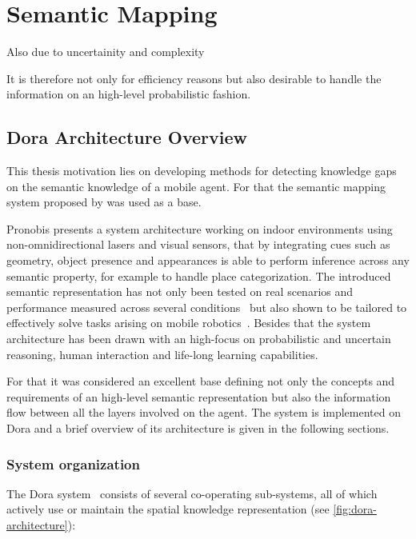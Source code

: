 \chapter{Semantic Mapping}\label{chap:semantic-mapping}

Also due to uncertainity and complexity 
% 

It is therefore not only for efficiency reasons but also desirable to handle
the information on an high-level probabilistic fashion.



\section{Dora Architecture Overview}
This thesis motivation lies on developing methods for detecting knowledge gaps
on the semantic knowledge of a mobile agent. For that the semantic mapping system
proposed by \cite{pronobis2011phd} was used as a base.

Pronobis presents a system architecture working on indoor environments using
non\hyp{}omnidirectional lasers and visual sensors, that by integrating cues such as geometry,
object presence and appearances is able to perform inference across any semantic property,
for example to handle place categorization.
The introduced semantic representation has not only been tested on real scenarios
and performance measured across several conditions~\cite{pronobis2007iros} but also shown
to be tailored to effectively solve tasks arising on mobile robotics~\cite{hanheide2011ijcai}.
Besides that the system architecture has been drawn with an high-focus on probabilistic
and uncertain reasoning, human interaction and life-long learning capabilities.

For that it was considered an excellent base defining not only the concepts and
requirements of an high-level semantic representation but also the information flow
between all the layers involved on the agent.
The system is implemented on \Gls{Dora} and a brief overview of its architecture is
given in the following sections.

\subsection{System organization}
The \Gls{Dora} system~\cite{hanheide2011ijcai} consists of several co-operating
sub-systems, all of which actively use or maintain the spatial knowledge representation
(see \autoref{fig:dora-architecture}):

